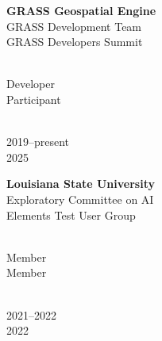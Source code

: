 \documentclass[10pt]{designcv}
\begin{document}


\begin{minipage}[t]{0.7\textwidth}
\raggedright
\textbf{GRASS Geospatial Engine}\\
GRASS Development Team\\
GRASS Developers Summit\\
\end{minipage}
\hfill
\begin{minipage}[t]{0.125\textwidth} 
\ \\
Developer\\
Participant\\
\end{minipage}
\hfill
\begin{minipage}[t]{0.15\textwidth}
\ \\
2019--present\\
2025\\
\end{minipage}

\begin{minipage}[t]{0.7\textwidth}
\textbf{Louisiana State University}\\
Exploratory Committee on AI\\
Elements Test User Group\\
\end{minipage}
\hfill
\begin{minipage}[t]{0.125\textwidth} 
\ \\
Member\\
Member\\
\end{minipage}
\hfill
\begin{minipage}[t]{0.15\textwidth}
\ \\
2021--2022\\
2022\\
\end{minipage}
\end{document}
